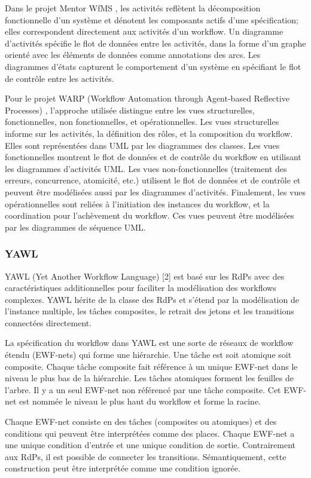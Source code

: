 Dans le projet Mentor WfMS \parencite{EDBT'98}, les activités reflètent la décomposition fonctionnelle d'un système et dénotent les composants actifs d'une spécification; elles correspondent directement aux activités d'un workflow. Un diagramme d'activités spécifie le flot de données entre les activités, dans la forme d'un graphe orienté avec les éléments de données comme annotations des arcs. Les diagrammes d'états capturent le comportement d'un système en spécifiant le flot de contrôle entre les activités.

Pour le projet WARP (Workflow Automation through Agent-based Reflective Processes) \parencite{WETICE'02}, l'approche utilisée distingue entre les vues structurelles, fonctionnelles, non fonctionnelles, et opérationnelles. Les vues structurelles informe sur les activités, la définition des rôles, et la composition du workflow. Elles sont représentées dans UML par les diagrammes des classes. Les vues fonctionnelles montrent le flot de données et de contrôle du workflow en utilisant les diagrammes d'activités UML. Les vues non-fonctionnelles (traitement des erreurs, concurrence, atomicité, etc.) utilisent le flot de données et de contrôle et peuvent être modélisées aussi par les diagrammes d'activités. Finalement, les vues opérationnelles sont reliées à l'initiation des instances du workflow, et la coordination pour l'achèvement du workflow. Ces vues peuvent être modélisées par les diagrammes de séquence UML.

\subsubsection{YAWL}
YAWL (Yet Another Workflow Language) [2] est basé sur les RdPs avec des caractéristiques additionnelles pour faciliter la modélisation des workflows complexes. YAWL hérite de la classe des RdPs et s'étend par la modélisation de l'instance multiple, les tâches composites, le retrait des jetons et les transitions connectées directement.

La spécification du workflow dans YAWL est une sorte de réseaux de workflow étendu (EWF-nets) qui forme une hiérarchie. Une tâche est soit atomique soit composite. Chaque tâche composite fait référence à un unique EWF-net dans le niveau le plus bas de la hiérarchie. Les tâches atomiques forment les feuilles de l'arbre. Il y a un seul EWF-net non référencé par une tâche composite. Cet EWF-net est nommée le niveau le plus haut du workflow et forme la racine. 

Chaque EWF-net consiste en des tâches (composites ou atomiques) et des conditions qui peuvent être interprétées comme des places. 
Chaque EWF-net a une unique condition d'entrée et une unique condition de sortie. Contrairement aux RdPs, il est possible de connecter les transitions. Sémantiquement, cette construction peut être interprétée comme une condition ignorée.

